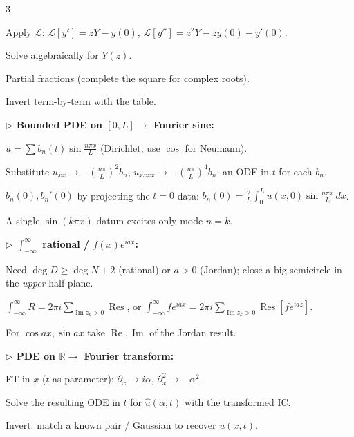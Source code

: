 \documentclass[a4paper,8pt]{extarticle}
\newcommand{\Res}{\operatorname{Res}}
\newcommand{\Lap}{\mathcal{L}}
\renewcommand{\Re}{\operatorname{Re}}
\renewcommand{\Im}{\operatorname{Im}}
\begin{document}
\begin{multicols}{3}
\begin{recipe}
\item Apply $\Lap$: $\Lap[y']{=}zY{-}y(0)$, $\Lap[y'']{=}z^2Y{-}zy(0){-}y'(0)$.
\item Solve algebraically for $Y(z)$.
\item Partial fractions (complete the square for complex roots).
\item Invert term-by-term with the table.
\end{recipe}
\textbf{\textcolor{cD}{$\triangleright$ Bounded PDE on $[0,L]\to$ Fourier sine:}}
\begin{recipe}
\item $u{=}\sum b_n(t)\sin\frac{n\pi x}L$ (Dirichlet; use $\cos$ for Neumann).
\item Substitute $u_{xx}{\to}{-}(\frac{n\pi}L)^2b_n$, $u_{xxxx}{\to}{+}(\frac{n\pi}L)^4b_n$: an ODE in $t$ for each $b_n$.
\item $b_n(0),b_n'(0)$ by projecting the $t{=}0$ data: $b_n(0){=}\frac2L\!\int_0^L\!u(x,0)\sin\frac{n\pi x}L\,dx$.
\item A single $\sin(k\pi x)$ datum excites only mode $n{=}k$.
\end{recipe}
\textbf{\textcolor{cD}{$\triangleright$ $\int_{-\infty}^{\infty}$ rational / $f(x)e^{iax}$:}}
\begin{recipe}
\item Need $\deg D\ge\deg N{+}2$ (rational) or $a{>}0$ (Jordan); close a big semicircle in the \emph{upper} half-plane.
\item $\int_{-\infty}^{\infty}\!R=2\pi i\!\sum_{\Im z_k>0}\!\Res$, or $\int_{-\infty}^{\infty}\!f e^{iax}=2\pi i\!\sum_{\Im z_k>0}\!\Res[f e^{iaz}]$.
\item For $\cos ax,\sin ax$ take $\Re,\Im$ of the Jordan result.
\end{recipe}
\textbf{\textcolor{cD}{$\triangleright$ PDE on $\mathbb{R}\to$ Fourier transform:}}
\begin{recipe}
\item FT in $x$ ($t$ as parameter): $\partial_x\to i\alpha$, $\partial_x^2\to-\alpha^2$.
\item Solve the resulting ODE in $t$ for $\hat u(\alpha,t)$ with the transformed IC.
\item Invert: match a known pair / Gaussian to recover $u(x,t)$.
\end{recipe}


\end{multicols}
\end{document}
